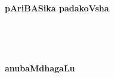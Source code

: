 \documentclass[twoside,11pt,openany]{book}
\begin{document}

\newpage

\mainmatter

\begin{multicols}{2}
\setlength{\columnseprule}{.5pt}

\end{multicols}
\newpage
\phantom{a}~
\thispagestyle{empty}
\newpage
~\phantom{a}
\thispagestyle{empty}
\vfill
\begin{center}
{\Huge\bf pAriBASika padakoVsha}
\end{center}
\vfill\eject
\phantom{a}~
\thispagestyle{empty}
\newpage
\begin{multicols}{2}

\end{multicols}
\newpage
~\phantom{a}
\thispagestyle{empty}
\newpage
~\phantom{a}
\thispagestyle{empty}
\vfill
\begin{center}
{\fontsize{30pt}{32pt}\selectfont\bf anubaMdhagaLu}
\bigskip
\bigskip

{\bf{}}
\end{center}
\vfill\eject
\phantom{a}~
\thispagestyle{empty}
\newpage

\end{document}
